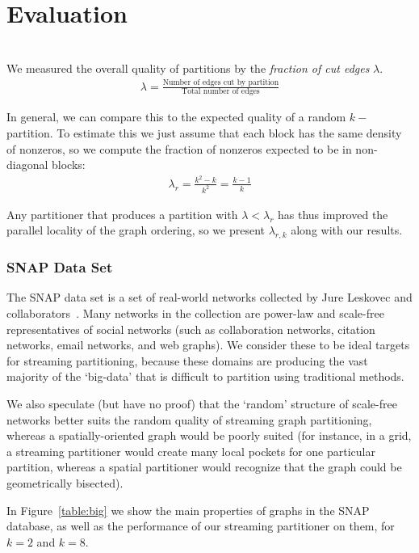 \section{Evaluation}
\\


We measured the overall quality of partitions by the \textit{fraction of cut edges} $\lambda$.
\begin{align}\lambda = \frac{\text{Number of edges cut by partition}}{\text{Total number of edges}}\end{align}

In general, we can compare this to the expected quality of a random $k-$partition. To estimate this we just assume that each block has the same density of nonzeros, so we compute the fraction of nonzeros expected to be in non-diagonal blocks:
\begin{align}\lambda_r = \frac{k^2 - k}{k^2} = \frac{k-1}{k} \end{align}

Any partitioner that produces a partition with $\lambda < \lambda_r$ has thus improved the parallel locality of the graph ordering, so we present $\lambda_{r,k}$ along with our results.

\subsubsection{SNAP Data Set}
The SNAP data set is a set of real-world networks collected by Jure Leskovec and collaborators~\cite{Leskovec-data}. Many networks in the collection are power-law and scale-free representatives of social networks (such as collaboration networks, citation networks, email networks, and web graphs). We consider these to be ideal targets for streaming partitioning, because these domains are producing the vast majority of the `big-data' that is difficult to partition using traditional methods. 

We also speculate (but have no proof) that the `random' structure of scale-free networks better suits the random quality of streaming graph partitioning, whereas a spatially-oriented graph would be poorly suited (for instance, in a grid, a streaming partitioner would create many local pockets for one particular partition, whereas a spatial partitioner would recognize that the graph could be geometrically bisected). 

In Figure~\ref{table:big} we show the main properties of graphs in the SNAP database, as well as the performance of our streaming partitioner on them, for $k=2$ and $k=8$. 

